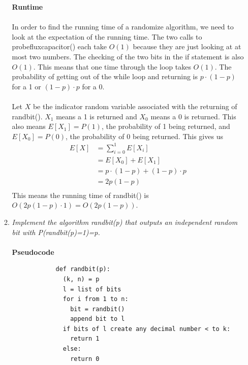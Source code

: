 \documentclass[12pt]{article}
\begin{document}
\begin{enumerate}
\begin{enumerate}
			\textbf{Runtime}\\
			\\
			In order to find the running time of a randomize algorithm, we need to look at the expectation of the running time.
			The two calls to probefluxcapacitor() each take $O(1)$ because they are just looking at at most two numbers. 
			The checking of the two bits in the if statement is also $O(1)$.  
			This means that one time through the loop takes $O(1)$.
			The probability of getting out of the while loop and returning is $p \cdot (1-p)$ for a 1 or $(1-p) \cdot p$ for a 0.\\
			\\
			Let $X$ be the indicator random variable associated with the returning of randbit().  
			$X_1$ means a 1 is returned and $X_0$ means a 0 is returned.  
			This also means $E[X_1] = P(1)$, the probability of 1 being returned, and $E[X_0] = P(0)$, the probability of 0 being returned.
			This gives us
			\begin{align*}
			E[X] &= \sum_{i=0}^{1} E[X_i]\\
			&= E[X_0] + E[X_1]\\
			&= p \cdot (1-p) + (1-p) \cdot p\\
			&= 2p(1-p)\\
			\end{align*}
			This means the running time of randbit() is $O(2p(1-p) \cdot 1) = O(2p(1-p))$.
			
			\item \textit{Implement the algorithm randbit(p) that outputs 
			an independent random bit with P(randbit(p)=1)=p.}\\
			\\
			\textbf{Pseudocode}
			\begin{verbatim}
			def randbit(p):
			  (k, n) = p
			  l = list of bits
			  for i from 1 to n:
			    bit = randbit()
			    append bit to l
			  if bits of l create any decimal number < to k:
			    return 1
			  else:
			    return 0


\end{verbatim}
\end{enumerate}
\end{enumerate}
\end{document}
